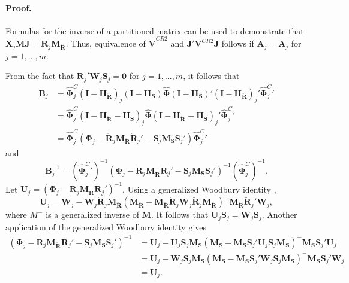 \documentclass[12pt]{article}\usepackage[]{graphicx}\usepackage[]{color}
\newcommand{\bm}{\mathbf}
\newcommand{\bs}{\boldsymbol}
\begin{document}
\paragraph{Proof.} Formulas for the inverse of a partitioned matrix can be used to demonstrate that $\bm{X}_j\bm{M}\bm{J} = \bm{\ddot{R}}_j \bm{M_{\ddot{R}}}$. Thus, equivalence of $\bm{\ddot{V}}^{CR2}$ and $\bm{J}'\bm{V}^{CR2}\bm{J}$ follows if $\bm{A}_j = \bm{\ddot{A}}_j$ for $j = 1,...,m$.

From the fact that $\bm{\ddot{R}}_j'\bm{W}_j\bm{S}_j = \bm{0}$ for $j = 1,...,m$, it follows that \begin{align*}
\bm{B}_j &= \bs{\hat\Phi}_j^C \left(\bm{I} - \bm{H_{\ddot{R}}}\right)_j \left(\bm{I} - \bm{H_S}\right) \hat{\bs\Phi} \left(\bm{I} - \bm{H_S}\right)' \left(\bm{I} - \bm{H_{\ddot{R}}}\right)_j' {\bs{\hat\Phi}_j^C}'\\
&= \bs{\hat\Phi}_j^C\left(\bm{I} - \bm{H_{\ddot{R}}} - \bm{H_S}\right)_j \hat{\bs\Phi} \left(\bm{I} - \bm{H_{\ddot{R}}} - \bm{H_S}\right)_j' {\bs{\hat\Phi}_j^C}' \\
&= \bs{\hat\Phi}_j^C \left(\bs\Phi_j - \bm{\ddot{R}}_j \bm{M_{\ddot{R}}}\bm{\ddot{R}}_j' - \bm{S}_j \bm{M_S}\bm{S}_j'\right){\bs{\hat\Phi}_j^C}'
\end{align*}
and 
\begin{equation}
\label{eq:B_j_inverse}
\bm{B}_j^{-1} = \left({\bs{\hat\Phi}_j^C}'\right)^{-1} \left(\bs\Phi_j - \bm{\ddot{R}}_j \bm{M_{\ddot{R}}}\bm{\ddot{R}}_j' - \bm{S}_j \bm{M_S}\bm{S}_j'\right)^{-1}\left(\bs{\hat\Phi}_j^C\right)^{-1}.
\end{equation}
Let $\bm{U}_j = \left(\bs\Phi_j - \bm{\ddot{R}}_j \bm{M_{\ddot{R}}}\bm{\ddot{R}}_j'\right)^{-1}$.
Using a generalized Woodbury identity \citep{Henderson1981on}, \[
\bm{U}_j = \bm{W}_j - \bm{W}_j \bm{\ddot{R}}_j \bm{M_{\ddot{R}}}\left(\bm{M_{\ddot{R}}} - \bm{M_{\ddot{R}}} \bm{\ddot{R}}_j \bm{W}_j \bm{\ddot{R}}_j \bm{M_{\ddot{R}}}\right)^{-} \bm{M_{\ddot{R}}}\bm{\ddot{R}}_j'\bm{W}_j, \]
where ${M}^{-}$ is a generalized inverse of $\bm{M}$. 
It follows that $\bm{U}_j \bm{S}_j = \bm{W}_j \bm{S}_j$. 
Another application of the generalized Woodbury identity gives 
\begin{align*}
\left(\bs\Phi_j - \bm{\ddot{R}}_j \bm{M_{\ddot{R}}}\bm{\ddot{R}}_j' - \bm{S}_j \bm{M_S}\bm{S}_j'\right)^{-1} &= \bm{U}_j - \bm{U}_j \bm{S}_j \bm{M_S}\left(\bm{M_S} - \bm{M_S}\bm{S}_j' \bm{U}_j \bm{S}_j\bm{M_S}\right)^{-} \bm{M_S} \bm{S}_j' \bm{U}_j \\
&= \bm{U}_j - \bm{W}_j \bm{S}_j \bm{M_S}\left(\bm{M_S} - \bm{M_S}\bm{S}_j' \bm{W}_j \bm{S}_j\bm{M_S}\right)^{-} \bm{M_S} \bm{S}_j' \bm{W}_j \\
&= \bm{U}_j.
\end{align*}
\end{document}
